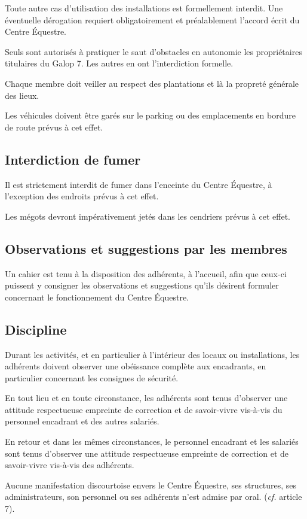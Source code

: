 \documentclass[11pt,a4paper]{article}
\begin{document}
Toute autre cas d'utilisation des installations est formellement interdit. Une éventuelle dérogation requiert obligatoirement et préalablement l'accord écrit du Centre Équestre.

Seuls sont autorisés à pratiquer le saut d'obstacles en autonomie les propriétaires titulaires du Galop 7. Les autres en ont l'interdiction formelle.

Chaque membre doit veiller au respect des plantations et là la propreté générale des lieux.

Les véhicules doivent être garés sur le parking ou des emplacements en bordure de route prévus à cet effet.

\subsection{Interdiction de fumer}
Il est strictement interdit de fumer dans l'enceinte du Centre Équestre, à l'exception des endroits prévus à cet effet.

Les mégots devront impérativement jetés dans les cendriers prévus à cet effet.

\subsection{Observations et suggestions par les membres}
Un cahier est tenu à la disposition des adhérents, à l'accueil, afin que ceux-ci puissent y consigner les observations et suggestions qu'ils désirent formuler concernant le fonctionnement du Centre Équestre.

\subsection{Discipline}
Durant les activités, et en particulier à l'intérieur des locaux ou installations, les adhérents doivent observer une obéissance complète aux encadrants, en particulier concernant les consignes de sécurité.

En tout lieu et en toute circonstance, les adhérents sont tenus d'observer une attitude respectueuse empreinte de correction et de savoir-vivre vis-à-vis du personnel encadrant et des autres salariés.

En retour et dans les mêmes circonstances, le personnel encadrant et les salariés sont tenus d'observer une attitude respectueuse empreinte de correction et de savoir-vivre vis-à-vis des adhérents.

Aucune manifestation discourtoise envers le Centre Équestre, ses structures, ses administrateurs, son personnel ou ses adhérents n'est admise par oral. (\textit{cf.} article 7).
\end{document}
